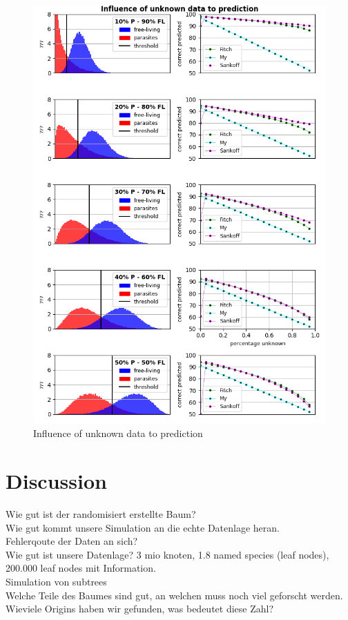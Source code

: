   \begin{figure}
    \caption{Influence of unknown data to prediction}
    \centering
    \includegraphics[width=1\textwidth]{Figures/simulation_evaluation_1.png}
  \end{figure}
  

\chapter{Discussion}
  Wie gut ist der randomisiert erstellte Baum? \\
  Wie gut kommt unsere Simulation an die echte Datenlage heran. \\
  Fehlerqoute der Daten an sich? \\
  Wie gut ist unsere Datenlage? 3 mio knoten, 1.8 named species (leaf nodes), 200.000 leaf nodes mit 
  Information. \\
  Simulation von subtrees \\
  Welche Teile des Baumes sind gut, an welchen muss noch viel geforscht werden. \\
  Wieviele Origins haben wir gefunden, was bedeutet diese Zahl? \\
  
